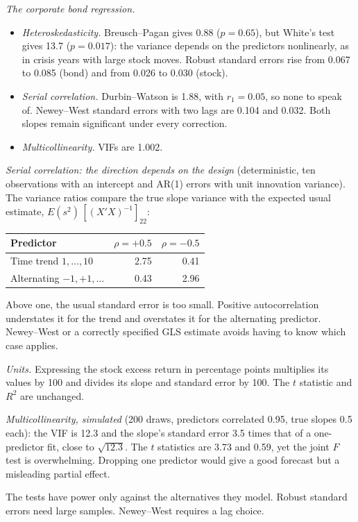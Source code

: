 \begin{qfmethod}
 \emph{The corporate bond regression.}
\begin{itemize}
\item \emph{Heteroskedasticity.} Breusch--Pagan gives 0.88 ($p=0.65$), but White's test gives 13.7 ($p=0.017$): the variance depends on the predictors nonlinearly, as in crisis years with large stock moves. Robust standard errors rise from 0.067 to 0.085 (bond) and from 0.026 to 0.030 (stock).
\item \emph{Serial correlation.} Durbin--Watson is 1.88, with $r_1=0.05$, so none to speak of. Newey--West standard errors with two lags are 0.104 and 0.032. Both slopes remain significant under every correction.
\item \emph{Multicollinearity.} VIFs are 1.002.
\end{itemize}
\emph{Serial correlation: the direction depends on the design} (deterministic, ten observations with an intercept and AR(1) errors with unit innovation variance). The variance ratios compare the true slope variance with the expected usual estimate, $E(s^2)\,[(X'X)^{-1}]_{22}$:
\begin{center}\small
\begin{tabular}{@{}lrr@{}}
\toprule
Predictor & $\rho=+0.5$ & $\rho=-0.5$ \\
\midrule
Time trend $1,\dots,10$ & 2.75 & 0.41 \\
Alternating $-1,+1,\dots$ & 0.43 & 2.96 \\
\bottomrule
\end{tabular}
\end{center}
Above one, the usual standard error is too small. Positive autocorrelation understates it for the trend and overstates it for the alternating predictor. Newey--West or a correctly specified GLS estimate avoids having to know which case applies.

\emph{Units.} Expressing the stock excess return in percentage points multiplies its values by 100 and divides its slope and standard error by 100. The $t$ statistic and $R^2$ are unchanged.

\emph{Multicollinearity, simulated} (200 draws, predictors correlated 0.95, true slopes 0.5 each): the VIF is 12.3 and the slope's standard error 3.5 times that of a one-predictor fit, close to $\sqrt{12.3}$. The $t$ statistics are 3.73 and 0.59, yet the joint $F$ test is overwhelming. Dropping one predictor would give a good forecast but a misleading partial effect.

 The tests have power only against the alternatives they model. Robust standard errors need large samples. Newey--West requires a lag choice.


\end{qfmethod}
